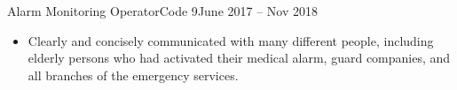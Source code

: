 \begin{cvsubsection}{Alarm Monitoring Operator}{Code 9}{June 2017 -- Nov 2018}
    \begin{itemize}
        \item Clearly and concisely communicated with many different people,
including elderly persons who had activated their medical alarm, guard companies, and all branches of the emergency services.
    \end{itemize}
\end{cvsubsection}